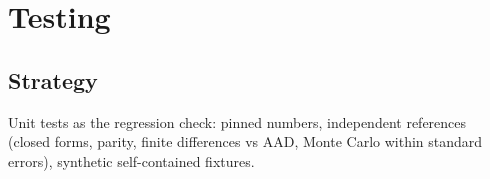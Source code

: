 \section{Testing}\label{sec:arch-testing}

\subsection{Strategy}\label{sec:arch-test-strategy}
Unit tests as the regression check: pinned numbers, independent references (closed forms, parity, finite
differences vs AAD, Monte Carlo within standard errors), synthetic self-contained fixtures.

\pending
